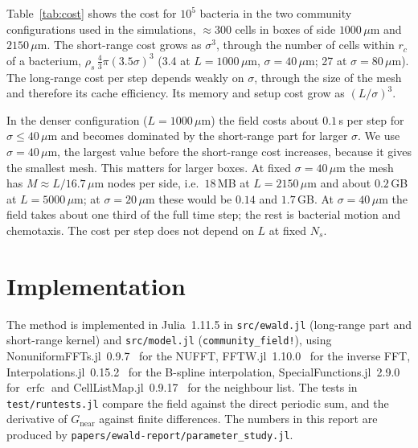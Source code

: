 \documentclass[11pt,a4paper]{article}
\newcommand{\erfc}{\operatorname{erfc}}
\newcommand{\um}{\,\mu\mathrm{m}}
\begin{document}
Table~\ref{tab:cost} shows the cost for $10^5$ bacteria in the two community configurations used in
the simulations, $\approx 300$ cells in boxes of side $1000\um$ and $2150\um$. The short-range cost
grows as $\sigma^3$, through the number of cells within $r_c$ of a bacterium,
$\rho_s\,\tfrac{4}{3}\pi(3.5\sigma)^3$ (3.4 at $L = 1000\um$, $\sigma = 40\um$; 27 at
$\sigma = 80\um$). The long-range cost per step depends weakly on $\sigma$, through the size of the
mesh and therefore its cache efficiency. Its memory and setup cost grow as $(L/\sigma)^3$.

In the denser configuration ($L = 1000\um$) the field costs about $0.1$\,s per step for
$\sigma \le 40\um$ and becomes dominated by the short-range part for larger $\sigma$. We use
$\sigma = 40\um$, the largest value before the short-range cost increases, because it gives the
smallest mesh. This matters for larger boxes. At fixed $\sigma = 40\um$ the mesh has $M \approx L/16.7\um$ nodes per side, i.e.\
$18$\,MB at $L = 2150\um$ and about $0.2$\,GB at $L = 5000\um$; at $\sigma = 20\um$ these would be
$0.14$ and $1.7$\,GB. At $\sigma = 40\um$ the field takes about one third of the full time step; the
rest is bacterial motion and chemotaxis. The cost per step does not depend on $L$ at fixed $N_s$.

\section{Implementation}

The method is implemented in Julia~1.11.5 in \texttt{src/ewald.jl} (long-range part and
short-range kernel) and \texttt{src/model.jl} (\texttt{community\_field!}), using
NonuniformFFTs.jl~0.9.7~\cite{NonuniformFFTs} for the NUFFT, FFTW.jl~1.10.0~\cite{FFTW} for the
inverse FFT, Interpolations.jl~0.15.2~\cite{Interpolations} for the B-spline interpolation,
SpecialFunctions.jl~2.9.0 for $\erfc$ and CellListMap.jl~0.9.17~\cite{CellListMap} for the
neighbour list. The tests in \texttt{test/runtests.jl} compare the field against the direct
periodic sum, and the derivative of $G_{\mathrm{near}}$ against finite differences. The numbers in
this report are produced by \texttt{papers/ewald-report/parameter\_study.jl}.
\end{document}
